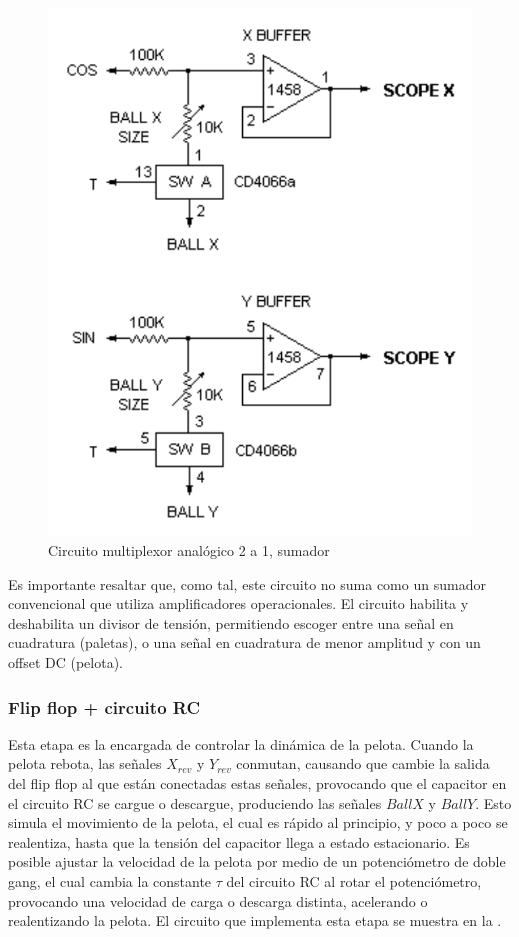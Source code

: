 \begin{figure}[H]
    \centering
    \includegraphics[width=0.5\linewidth]{figs/descripcion/multiplexor.png}
    \caption{Circuito multiplexor analógico 2 a 1, sumador \cite{pong}}
    \label{mux}
\end{figure}

Es importante resaltar que, como tal, este circuito no suma como un sumador convencional que utiliza amplificadores operacionales.
El circuito habilita y deshabilita un divisor de tensión, permitiendo escoger entre una señal en cuadratura (paletas), o una señal en cuadratura de menor amplitud y con un offset DC (pelota).

\subsubsection{Flip flop + circuito RC}
Esta etapa es la encargada de controlar la dinámica de la pelota. 
Cuando la pelota rebota, las señales $X_{rev}$ y $Y_{rev}$ conmutan, causando que cambie la salida del flip flop al que están conectadas estas señales, provocando que el capacitor en el circuito RC se cargue o descargue, produciendo las señales $BallX$ y $BallY$.
Esto simula el movimiento de la pelota, el cual es rápido al principio, y poco a poco se realentiza, hasta que la tensión del capacitor llega a estado estacionario. 
Es posible ajustar la velocidad de la pelota por medio de un potenciómetro de doble gang, el cual cambia la constante $\tau$ del circuito RC al rotar el potenciómetro, provocando una velocidad de carga o descarga distinta, acelerando o realentizando la pelota.
El circuito que implementa esta etapa se muestra en la .

